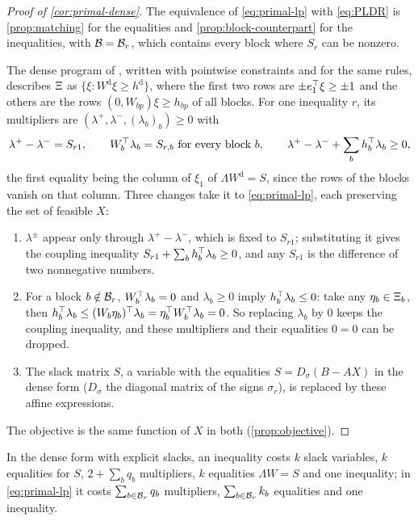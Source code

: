 \begin{proof}[Proof of \cref{cor:primal-dense}]
The equivalence of \eqref{eq:primal-lp} with \eqref{eq:PLDR} is \cref{prop:matching} for the equalities and \cref{prop:block-counterpart} for the inequalities, with $\mathcal{B} = \mathcal{B}_r$, which contains every block where $S_r$ can be nonzero.

The dense program of \citet[(4.2)]{KWG2011}, written with pointwise constraints and for the same rules, describes $\Xi$ as $\{\xi : W^{\mathrm{d}}\xi \ge h^{\mathrm{d}}\}$, where the first two rows are $\pm e_1^\top\xi \ge \pm1$ and the others are the rows $(0, W_{bp})\xi \ge h_{bp}$ of all blocks.
For one inequality $r$, its multipliers are $(\lambda^+, \lambda^-, (\lambda_b)_b) \ge 0$ with
\[
\lambda^+ - \lambda^- = S_{r1}, \qquad
W_b^\top\lambda_b = S_{r,b} \text{ for every block } b, \qquad
\lambda^+ - \lambda^- + \sum_b h_b^\top\lambda_b \ge 0,
\]
the first equality being the column of $\xi_1$ of $\Lambda W^{\mathrm{d}} = S$, since the rows of the blocks vanish on that column.
Three changes take it to \eqref{eq:primal-lp}, each preserving the set of feasible $X$:
\begin{enumerate}[nosep]
\item $\lambda^\pm$ appear only through $\lambda^+ - \lambda^-$, which is fixed to $S_{r1}$; substituting it gives the coupling inequality $S_{r1} + \sum_b h_b^\top\lambda_b \ge 0$, and any $S_{r1}$ is the difference of two nonnegative numbers.
\item For a block $b \notin \mathcal{B}_r$, $W_b^\top\lambda_b = 0$ and $\lambda_b \ge 0$ imply $h_b^\top\lambda_b \le 0$: take any $\eta_b \in \Xi_{b}$, then $h_b^\top\lambda_b \le (W_b\eta_b)^\top\lambda_b = \eta_b^\top W_b^\top\lambda_b = 0$.
So replacing $\lambda_b$ by $0$ keeps the coupling inequality, and these multipliers and their equalities $0 = 0$ can be dropped.
\item The slack matrix $S$, a variable with the equalities $S = D_\sigma(B - AX)$ in the dense form ($D_\sigma$ the diagonal matrix of the signs $\sigma_r$), is replaced by these affine expressions.
\end{enumerate}
The objective is the same function of $X$ in both (\cref{prop:objective}).
\end{proof}

In the dense form with explicit slacks, an inequality costs $k$ slack variables, $k$ equalities for $S$, $2 + \sum_b q_b$ multipliers, $k$ equalities $\Lambda W = S$ and one inequality;
in \eqref{eq:primal-lp} it costs $\sum_{b\in\mathcal{B}_r} q_b$ multipliers, $\sum_{b\in\mathcal{B}_r} k_b$ equalities and one inequality.
